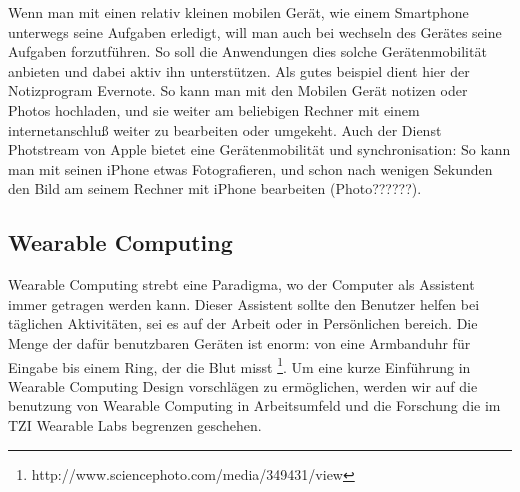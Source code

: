 Wenn man mit einen relativ kleinen mobilen Gerät, wie einem Smartphone unterwegs seine Aufgaben erledigt, will man auch bei wechseln des Gerätes seine Aufgaben forzutführen. So soll die Anwendungen dies solche Gerätenmobilität anbieten und dabei aktiv ihn unterstützen. Als gutes beispiel dient hier der Notizprogram Evernote. So kann man mit den Mobilen Gerät notizen oder Photos hochladen, und sie weiter am beliebigen Rechner mit einem internetanschluß weiter zu bearbeiten oder umgekeht. Auch der Dienst Photstream von Apple bietet eine Gerätenmobilität und synchronisation: So kann man mit seinen iPhone etwas Fotografieren, und schon nach wenigen Sekunden den Bild am seinem Rechner mit iPhone bearbeiten (Photo??????). 












\subsection{Wearable Computing} 
\label{sub:wearable_computers}

Wearable Computing strebt eine Paradigma, wo der Computer als Assistent immer getragen werden kann. Dieser Assistent sollte den Benutzer helfen bei täglichen Aktivitäten, sei es auf der Arbeit oder in Persönlichen bereich. Die Menge der dafür benutzbaren Geräten ist enorm: von eine Armbanduhr für Eingabe bis einem  Ring, der die Blut misst \footnote{http://www.sciencephoto.com/media/349431/view}. Um eine kurze Einführung in Wearable Computing Design vorschlägen zu ermöglichen, werden wir auf die benutzung von Wearable Computing in Arbeitsumfeld und die Forschung die im TZI Wearable Labs begrenzen geschehen.


